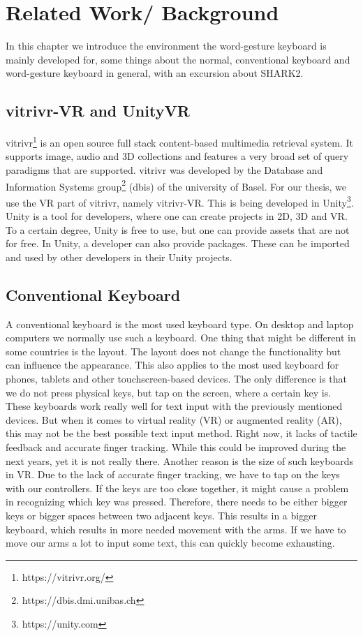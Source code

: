 \chapter{Related Work/ Background}

In this chapter we introduce the environment the word-gesture keyboard is mainly developed for, some things about the normal, conventional keyboard and word-gesture keyboard in general, with an excursion about SHARK2.

\section{vitrivr-VR and UnityVR}
vitrivr\footnote{https://vitrivr.org/} is an open source full stack content-based multimedia retrieval system. It supports image, audio and 3D collections and features a very broad set of query paradigms that are supported. vitrivr was developed by the Database and Information Systems group\footnote{https://dbis.dmi.unibas.ch} (dbis) of the university of Basel. For our thesis, we use the VR part of vitrivr, namely vitrivr-VR. This is being developed in Unity\footnote{https://unity.com}. Unity is a tool for developers, where one can create projects in 2D, 3D and VR. To a certain degree, Unity is free to use, but one can provide assets that are not for free. In Unity, a developer can also provide packages. These can be imported and used by other developers in their Unity projects.

\section{Conventional Keyboard}
A conventional keyboard is the most used keyboard type. On desktop and laptop computers we normally use such a keyboard. One thing that might be different in some countries is the layout. The layout does not change the functionality but can influence the appearance. This also applies to the most used keyboard for phones, tablets and other touchscreen-based devices. The only difference is that we do not press physical keys, but tap on the screen, where a certain key is. These keyboards work really well for text input with the previously mentioned devices. But when it comes to virtual reality (VR) or augmented reality (AR), this may not be the best possible text input method. Right now, it lacks of tactile feedback and accurate finger tracking. While this could be improved during the next years, yet it is not really there. Another reason is the size of such keyboards in VR. Due to the lack of accurate finger tracking, we have to tap on the keys with our controllers. If the keys are too close together, it might cause a problem in recognizing which key was pressed. Therefore, there needs to be either bigger keys or bigger spaces between two adjacent keys. This results in a bigger keyboard, which results in more needed movement with the arms. If we have to move our arms a lot to input some text, this can quickly become exhausting.

